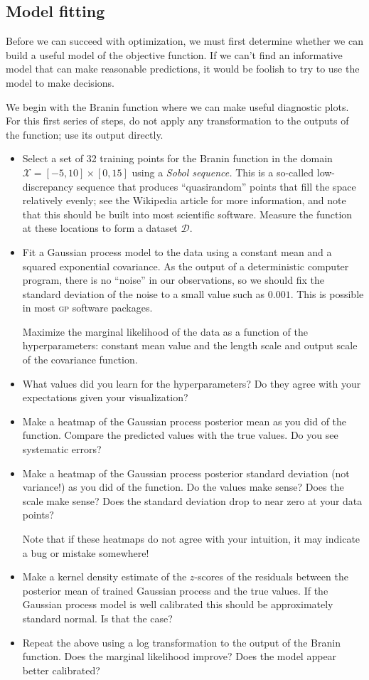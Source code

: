 \documentclass{article}
\newcommand{\acro}[1]{\textsc{\MakeLowercase{#1}}}
\newcommand{\mc}[1]{\mathcal{#1}}
\newcommand{\data}{\mc{D}}
\begin{document}
\subsection*{Model fitting}

Before we can succeed with optimization, we must first determine whether we can
build a useful model of the objective function. If we can't find an informative
model that can make reasonable predictions, it would be foolish to try to use
the model to make decisions.

We begin with the Branin function where we can make useful diagnostic plots. For
this first series of steps, do not apply any transformation to the outputs of
the function; use its output directly.

\begin{itemize}
\item
  Select a set of 32 training points for the Branin function in the domain
  $\mc{X} = [-5, 10] \times [0, 15]$ using a \emph{Sobol sequence.} This is a
  so-called low-discrepancy sequence that produces ``quasirandom'' points that
  fill the space relatively evenly; see the Wikipedia article for more
  information, and note that this should be built into most scientific
  software. Measure the function at these locations to form a dataset $\data$.
\item
  Fit a Gaussian process model to the data using a constant mean and a squared
  exponential covariance. As the output of a deterministic computer program,
  there is no ``noise'' in our observations, so we should fix the standard
  deviation of the noise to a small value such as $0.001$. This is possible in
  most \acro{GP} software packages.

  Maximize the marginal likelihood of the data as a function of the
  hyperparameters: constant mean value and the length scale and output scale of
  the covariance function.
\item
  What values did you learn for the hyperparameters? Do they agree with your
  expectations given your visualization?
\item
  Make a heatmap of the Gaussian process posterior mean as you did of the
  function. Compare the predicted values with the true values.  Do you see
  systematic errors?
\item
  Make a heatmap of the Gaussian process posterior standard deviation (not
  variance!) as you did of the function. Do the values make sense? Does the
  scale make sense? Does the standard deviation drop to near zero at your data
  points?

  Note that if these heatmaps do not agree with your intuition, it may indicate
  a bug or mistake somewhere!
\item
  Make a kernel density estimate of the $z$-scores of the residuals between the
  posterior mean of trained Gaussian process and the true values. If the
  Gaussian process model is well calibrated this should be approximately
  standard normal. Is that the case?
\item
  Repeat the above using a log transformation to the output of the Branin
  function. Does the marginal likelihood improve? Does the model appear better
  calibrated?
\end{itemize}
\end{document}
